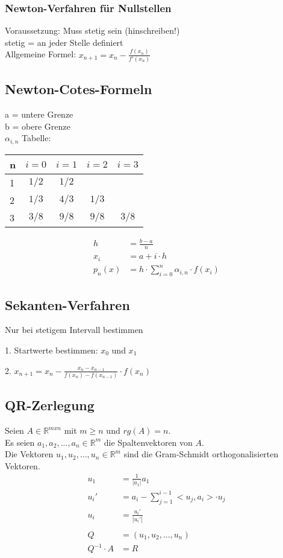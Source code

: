 \documentclass[a4paper, 10pt, landscape]{article}
\begin{document}
\begin{multicols}{5}
\begin{small}
				
			\subsubsection{Newton-Verfahren für Nullstellen}
				Voraussetzung: Muss stetig sein (hinschreiben!)\\
				stetig = an jeder Stelle definiert\\
				Allgemeine Formel: $x_{n+1}=x_{n}-\frac{f(x_{n})}{f'(x_{n})}$ 
	    \subsection{Newton-Cotes-Formeln}
   			a = untere Grenze\\
			b = obere Grenze\\
			$\alpha_{i,n}$ Tabelle:\\
			\begin{tabular}{l | c c c c }
				\noindent
				n & $i=0$ & $i=1$ & $i=2$ & $i=3$ \\\hline
				1 & $1/2$ & $1/2$ & & \\
				2 & $1/3$ & $4/3$ & $1/3$ & \\
				3 & $3/8$ & $9/8$ & $9/8$ & $3/8$
			\end{tabular}
			\begin{align*}
		        h &= \frac{b-a}{n}\\
		        x_i &= a+i\cdot h\\
		        p_{n}(x) &= h\cdot \sum_{i=0}^{n}\alpha_{i,n}\cdot f(x_{i})
			\end{align*}
		\subsection{Sekanten-Verfahren}
			Nur bei stetigem Intervall bestimmen\\
			\begin{compactitem}
				\item[1.] Startwerte bestimmen: $x_0$ und $x_1$
				\item[2.] $x_{n+1}=x_{n}-\frac{x_{n}-x_{n-1}}{f(x_{n})-f(x_{n-1})}\cdot f(x_{n})$
			\end{compactitem}
		\subsection{QR-Zerlegung}
			Seien $A \in \mathbb{R}^{mxn}$ mit $m \ge n$ und $rg(A) = n$.\\
			Es seien $a_1, a_2, ..., a_n \in \mathbb{R}^m$ die Spaltenvektoren von $A$. \\
			Die Vektoren $u_1, u_2, ..., u_n \in \mathbb{R}^m$ sind die Gram-Schmidt orthogonalisierten Vektoren. 
			\begin{align*}
				u_1 &= \frac{1}{|a_1|} a_1\\
				u_i' &= a_i - \sum_{j = 1}^{i-1} <u_j, a_i> \cdot u_j\\
				u_i &= \frac{u_i'}{|u_i'|}\\\\	 
				Q &= (u_1, u_2, ..., u_n)\\
				Q^{-1}\cdot A &= R 
			\end{align*}

\end{small}
\end{multicols}
\end{document}
